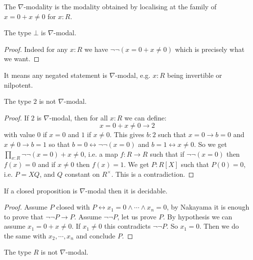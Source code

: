 \begin{definition}
The $\nabla$-modality is the modality obtained by localising at the family of $x=0+x\not=0$ for $x:R$.
\end{definition}

\begin{lemma}
The type $\bot$ is $\nabla$-modal.
\end{lemma}

\begin{proof}
Indeed for any $x:R$ we have $\neg\neg(x=0 + x\not=0)$ which is precisely what we want.
\end{proof}

\begin{remark}
It means any negated statement is $\nabla$-modal, e.g. $x:R$ being invertible or nilpotent.
\end{remark}

\begin{lemma}
The type $2$ is not $\nabla$-modal.
\end{lemma}

\begin{proof}
If $2$ is $\nabla$-modal, then for all $x:R$ we can define:
\[x=0+x\not=0\to 2\]
with value $0$ if $x=0$ and $1$ if $x\not=0$. This gives $b:2$ such that $x=0 \to b=0$ and $x\not=0\to b=1$ so that $b=0 \leftrightarrow \neg\neg(x=0)$ and $b=1\leftrightarrow x\not=0$. So we get $\prod_{x:R} \neg\neg(x=0)+x\not=0$, i.e. a map $f:R\to R$ such that if $\neg\neg(x=0)$ then $f(x)=0$ and if $x\not=0$ then $f(x)=1$. We get $P:R[X]$ such that $P(0)=0$, i.e. $P = XQ$, and $Q$ constant on $R^\times$. This is a contradiction.
\end{proof}

\begin{lemma}\label{closed-not-nabla}
If a closed proposition is $\nabla$-modal then it is decidable.
\end{lemma}

\begin{proof}
Assume $P$ closed with $P \leftrightarrow x_1=0\land\cdots\land x_n=0$, by Nakayama it is enough to prove that $\neg\neg P\to P$. Assume $\neg\neg P$, let us prove $P$. By hypothesis we can assume $x_1=0+x\not=0$. If $x_1\not=0$ this contradicts $\neg\neg P$. So $x_1=0$. Then we do the same with $x_2,\cdots,x_n$ and conclude $P$.
\end{proof}

\begin{corollary}
The type $R$ is not $\nabla$-modal.
\end{corollary}

